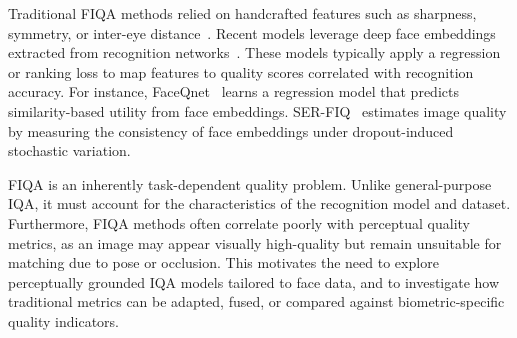 Traditional FIQA methods relied on handcrafted features such as sharpness, symmetry, or inter-eye distance~\cite{grother2003facequality}. Recent models leverage deep face embeddings extracted from recognition networks~\cite{terhorst2020serfiq, terhorst2022quality}. These models typically apply a regression or ranking loss to map features to quality scores correlated with recognition accuracy. For instance, FaceQnet~\cite{best2018faceqnet, hernandezortiz2019faceqnetv2} learns a regression model that predicts similarity-based utility from face embeddings. SER-FIQ~\cite{terhorst2020serfiq} estimates image quality by measuring the consistency of face embeddings under dropout-induced stochastic variation.

FIQA is an inherently task-dependent quality problem. Unlike general-purpose IQA, it must account for the characteristics of the recognition model and dataset. Furthermore, FIQA methods often correlate poorly with perceptual quality metrics, as an image may appear visually high-quality but remain unsuitable for matching due to pose or occlusion. This motivates the need to explore perceptually grounded IQA models tailored to face data, and to investigate how traditional metrics can be adapted, fused, or compared against biometric-specific quality indicators.


